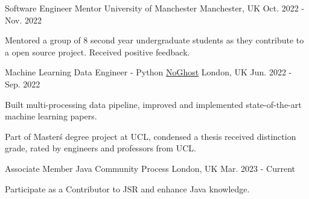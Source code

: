 



\begin{cventries}

    \cventry
        {Software Engineer Mentor} %
        {University of Manchester} %
        {Manchester, UK} %
        {Oct. 2022 - Nov. 2022} %
        {
        \begin{cvitems} %
            \item {Mentored a group of 8 second year undergraduate students as they contribute to a open source project. Received positive feedback.}
        \end{cvitems}
        }

    \cventry
        {Machine Learning Data Engineer - Python} %
        {\href{https://www.noghost.co.uk/}{NoGhost}} %
        {London, UK} %
        {Jun. 2022 - Sep. 2022} %
        {
        \begin{cvitems} %
            \item {Built multi-processing data pipeline, improved and implemented state-of-the-art machine learning papers.}
            \item {Part of Master\'s degree project at UCL, condensed a thesis received distinction grade, rated by engineers and professors from UCL.}
        \end{cvitems}
        }

    \cventry
        {Associate Member} %
        {Java Community Process} %
        {London, UK} %
        {Mar. 2023 - Current} %
        {
        \begin{cvitems} %
            \item {Participate as a Contributor to JSR and enhance Java knowledge.}
        \end{cvitems}
        }


\end{cventries}